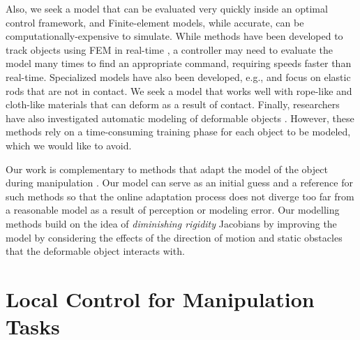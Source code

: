 Also, we seek a model that can be evaluated very quickly inside an optimal control framework, and Finite-element models, while accurate, can be computationally-expensive to simulate. While methods have been developed to track objects using FEM in real-time \cite{Petit2017}, a controller may need to evaluate the model many times to find an appropriate command, requiring speeds faster than real-time. Specialized models have also been developed, e.g., \cite{Borum2014} and \cite{Bretl2014} focus on elastic rods that are not in contact. We seek a model that works well with rope-like and cloth-like materials that can deform as a result of contact. Finally, researchers have also investigated automatic modeling of deformable objects \cite{Lang2002, Cretu2008}. However, these methods rely on a time-consuming training phase for each object to be modeled, which we would like to avoid.

Our work is complementary to methods that adapt the model of the object during manipulation \cite{Navarro-Alarcon2014, NavarroAlarcon2018, Hu2018deformable_gpr}. Our model can serve as an initial guess and a reference for such methods so that the online adaptation process does not diverge too far from a reasonable model as a result of perception or modeling error. Our modelling methods build on the idea of \textit{diminishing rigidity} Jacobians \cite{Berenson2013} by improving the model by considering the effects of the direction of motion and static obstacles that the deformable object interacts with.


\section{Local Control for Manipulation Tasks}


